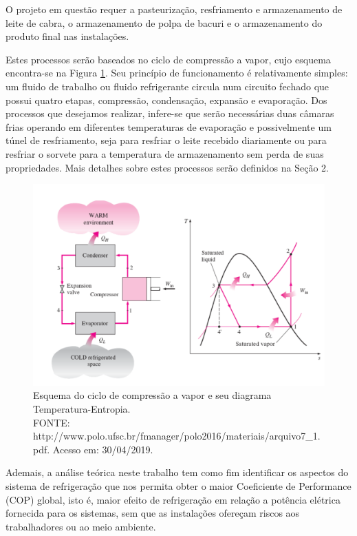 \documentclass[10pt,a4paper]{article}
\begin{document}
O projeto em questão requer a pasteurização, resfriamento e armazenamento de leite de cabra, o armazenamento de polpa de bacuri e o armazenamento do produto final nas instalações. 

Estes processos serão baseados no ciclo de compressão a vapor, cujo esquema encontra-se na Figura \ref{ciclo_vapor}. Seu princípio de funcionamento é relativamente simples: um fluido de trabalho ou fluido refrigerante circula num circuito fechado que possui quatro etapas, compressão, condensação, expansão e evaporação. Dos processos que desejamos realizar, infere-se que serão necessárias duas câmaras frias operando em diferentes temperaturas de evaporação e possivelmente um túnel de resfriamento, seja para resfriar o leite recebido diariamente ou para resfriar o sorvete para a temperatura de armazenamento sem perda de suas propriedades. Mais detalhes sobre estes processos serão definidos na Seção 2.

\begin{figure}[H]
\centering
\includegraphics[width=15cm]{Figuras/ciclo_vapor.png}
\caption{Esquema do ciclo de compressão a vapor e seu diagrama Temperatura-Entropia. \\
FONTE: http://www.polo.ufsc.br/fmanager/polo2016/materiais/arquivo7\_1.pdf. Acesso em: 30/04/2019.}
\label{ciclo_vapor}
\end{figure}

Ademais, a análise teórica neste trabalho tem como fim identificar os aspectos do sistema de refrigeração que nos permita obter o maior Coeficiente de Performance (COP) global, isto é, maior efeito de refrigeração em relação a potência elétrica fornecida para os sistemas, sem que as instalações ofereçam riscos aos trabalhadores ou ao meio ambiente.
\end{document}
